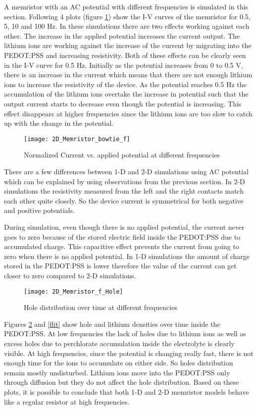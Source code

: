 \begin{doublespace}
A memristor with an AC potential with different frequencies is simulated in this section. Following 4 plots (figure \ref{1dIV}) show the I-V curves of the memristor for 0.5, 5, 10 and 100 Hz. In these simulations there are two effects working against each other. The increase in the applied potential increases the current output. The lithium ions are working against the increase of the current by migrating into the PEDOT:PSS and increasing resistivity. Both of these effects can be clearly seen in the I-V curve for 0.5 Hz. Initially as the potential increases from 0 to 0.5 V, there is an increase in the current which means that there are not enough lithium ions to increase the resistivity of the device. As the potential reaches 0.5 Hz the accumulation of the lithium ions overtake the increase in potential such that the output current starts to decrease even though the potential is increasing. This effect disappears at higher frequencies since the lithium ions are too slow to catch up with the change in the potential. 
   
\begin{figure}[!htp]
\centering
\texttt{[image: 2D\_Memristor\_bowtie\_f]}
\caption{Normalized Current vs. applied potential at different frequencies} 
\label{1dIV}
\end{figure}

There are a few differences between 1-D and 2-D simulations using AC potential which can be explained by using observations from the previous section. In 2-D simulations the resistivity measured from the left and the right contacts match each other quite closely. So the device current is symmetrical for both negative and positive potentials. 

During simulation, even though there is no applied potential, the current never goes to zero because of the stored electric field inside the PEDOT:PSS due to accumulated charge. This capacitive effect prevents the current from going to zero when there is no applied potential. In 1-D simulations the amount of charge stored in the PEDOT:PSS is lower therefore the value of the current can get closer to zero compared to 2-D simulations.  

\begin{figure}[!htp]
\centering
\texttt{[image: 2D\_Memristor\_f\_Hole]}
\caption{Hole distribution over time at different frequencies} 
\label{fhole}
\end{figure}

Figures \ref{fhole} and \ref{flit} show hole and lithium densities over time inside the PEDOT:PSS. At low frequencies the lack of holes due to lithium ions as well as excess holes due to perchlorate accumulation inside the electrolyte is clearly visible. At high frequencies, since the potential is changing really fast, there is not enough time for the ions to accumulate on either side. So holes distribution remain mostly undisturbed. Lithium ions move into the PEDOT:PSS only through diffusion but they do not affect the hole distribution. Based on these plots, it is possible to conclude that both 1-D and 2-D memristor models behave like a regular resistor at high frequencies. 



\end{doublespace}
